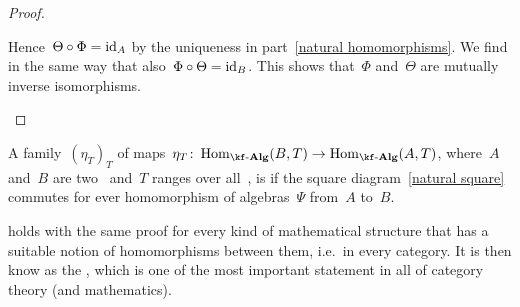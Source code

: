 \begin{proof}
\begin{enumerate}
      Hence~$\Theta \circ \Phi = \mathrm{id}_A$ by the uniqueness in part~\ref*{natural homomorphisms}.
      We find in the same way that also~$\Phi \circ \Theta = \mathrm{id}_B$.
      This shows that~$\Phi$ and~$\Theta$ are mutually inverse isomorphisms.
    \qedhere
  \end{enumerate}
\end{proof}


\begin{definition}
  A family~$(\eta_T)_T$ of maps~$\eta_T \colon \Hom_{\cAlg{\kf}}(B,T) \to \Hom_{\cAlg{\kf}}(A,T)$, where~$A$ and~$B$ are two~{\algebras{$\kf$}} and~$T$ ranges over all~{\algebras{$\kf$}}, is  if the square diagram~\eqref{natural square} commutes for ever homomorphism of algebras~$\Psi$ from~$A$ to~$B$.
\end{definition}


\begin{remark}
   holds with the same proof for every kind of mathematical structure that has a suitable notion of homomorphisms between them, i.e.\ in every category.
  It is then know as the , which is one of the most important statement in all of category theory (and mathematics).
\end{remark}













